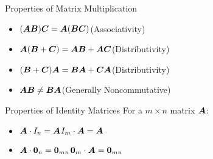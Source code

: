 \documentclass{beamer}
\begin{document}
\begin{frame}
\begin{block}{Properties of Matrix Multiplication}
\begin{itemize}
\item $(\boldsymbol{A}\boldsymbol{B})\boldsymbol{C}=\boldsymbol{A}(\boldsymbol{B}\boldsymbol{C})$\hfill (Associativity)
\item $\boldsymbol{A}(\boldsymbol{B}+\boldsymbol{C})=\boldsymbol{A}\boldsymbol{B}+\boldsymbol{A}\boldsymbol{C}$\hfill (Distributivity)
\item $(\boldsymbol{B}+\boldsymbol{C})\boldsymbol{A}=\boldsymbol{B}\boldsymbol{A}+\boldsymbol{C}\boldsymbol{A}$\hfill (Distributivity)\pause
\item $\boldsymbol{A}\boldsymbol{B}\neq \boldsymbol{B}\boldsymbol{A}$\hfill (Generally Noncommutative)
\end{itemize}
\end{block}\pause
\begin{block}{Properties of Identity Matrices}
For a $m\times n$ matrix $\boldsymbol{A}$:
\begin{itemize}
\item $\boldsymbol{A}\cdot I_n = \boldsymbol{A}$\quad{}\quad$I_m\cdot \boldsymbol{A} = \boldsymbol{A}$
\item $\boldsymbol{A}\cdot\boldsymbol{0}_{n} = \boldsymbol{0}_{mn}$\quad{}\quad$\boldsymbol{0}_{m}\cdot \boldsymbol{A}=\boldsymbol{0}_{mn}$
\end{itemize}
\end{block}
\end{frame}
\end{document}
